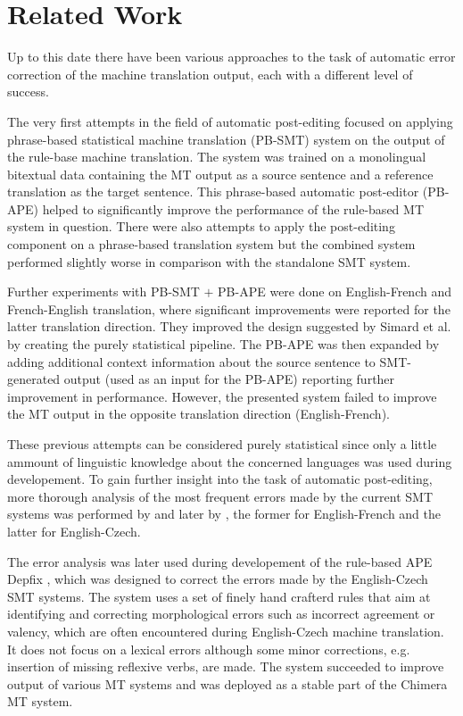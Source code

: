 \section{Related Work}

Up to this date there have been various approaches to the task of automatic
error correction of the machine translation output, each with a different level of success.

The very first attempts in the field of automatic post-editing \citep{simard2007rule}
focused on applying phrase-based statistical machine translation (PB-SMT)
system on the output of the rule-base machine translation. The system was trained on a monolingual
bitextual data containing the MT output as a source sentence and a reference translation as
the target sentence. This phrase-based automatic post-editor (PB-APE) helped to significantly improve
the performance of the rule-based MT system in question.
There were also attempts to apply the post-editing component
on a phrase-based translation system but the combined system performed slightly worse in comparison
with the standalone SMT system.

Further experiments with PB-SMT $+$ PB-APE \citep{bechara:2011} were done
on English-French and French-English translation, where significant improvements were reported
for the latter translation direction. They improved the design suggested by Simard et al. by
creating the purely statistical pipeline. The PB-APE was then expanded by adding additional
context information about the source sentence to SMT-generated output (used as an input for
the PB-APE) reporting further improvement in performance. However, the presented system failed to
improve the MT output in the opposite translation direction (English-French).

These previous attempts can be considered purely statistical since only a little ammount of linguistic
knowledge about the concerned languages was used during developement. To gain further insight into
the task of automatic post-editing, more thorough analysis of the most frequent errors made by the current
SMT systems was performed by \citet{bechara:master} and later by \citet{biblio:RoAutomaticpostediting2013}, the former
for English-French and the latter for English-Czech.

The error analysis was later used during developement of the rule-based APE Depfix \citep{depfix:2014},
which was designed to correct the errors made by the English-Czech SMT systems.
The system uses a set of finely hand crafterd rules that aim at identifying
and correcting morphological errors such as incorrect agreement or valency, which are
often encountered during English-Czech machine translation. It does not focus on a lexical errors
although some minor corrections, e.g. insertion of missing reflexive verbs, are made. The system
succeeded to improve output of various MT systems and was deployed as a stable part of the
Chimera \citep{biblio:BoRoChimera2013} MT system.

